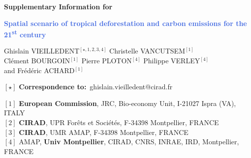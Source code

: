 
\begin{center}
  \Large{\textbf{Supplementary Information for}}
\end{center}

\vspace{1cm}

\begin{center}
  \LARGE{\textbf{\textcolor{RoyalBlue}{Spatial scenario of tropical deforestation and carbon emissions for the 21\textsuperscript{st} century}}}
\end{center}

\vspace{1cm}

\begin{center}
  \large{
  Ghislain VIEILLEDENT$^{[\star, 1, 2, 3, 4]}$ \hspace{0.5cm} Christelle VANCUTSEM$^{[1]}$\\
  \vspace{0.5cm}
  Clément BOURGOIN$^{[1]}$ \hspace{0.5cm} Pierre PLOTON$^{[4]}$ \hspace{0.5cm} Philippe VERLEY$^{[4]}$\\
  \vspace{0.5cm}
  and \hspace{0.5cm} Frédéric ACHARD$^{[1]}$
  }
\end{center}

\vspace{0.5cm}

\begin{center}
  $[\star]$ \textbf{Correspondence to:}~ghislain.vieilledent@cirad.fr\\
\end{center}

\vspace{0.5cm}

{\small
  \begin{flushleft}
    $[1]$ \textbf{European Commission}, JRC, Bio-economy Unit, I-21027 Ispra (VA), ITALY\\
    $[2]$ \textbf{CIRAD}, UPR Forêts et Sociétés, F-34398 Montpellier, FRANCE\\
    $[3]$ \textbf{CIRAD}, UMR AMAP, F-34398 Montpellier, FRANCE\\
    $[4]$ AMAP, \textbf{Univ Montpellier}, CIRAD, CNRS, INRAE, IRD, Montpellier, FRANCE\\
  \end{flushleft}}

